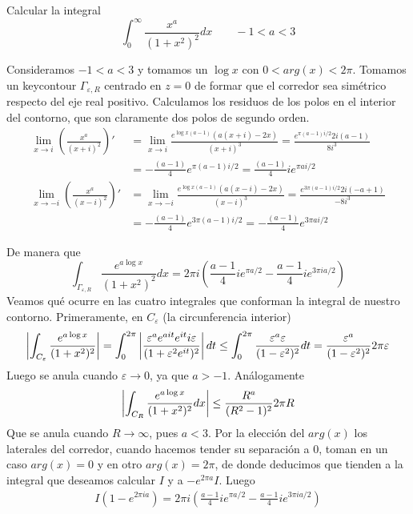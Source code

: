 \documentclass[twoside]{article}
\begin{document}
\begin{ejercicio}{3}
Calcular la integral
$$
\int_0^\infty \frac{x^a}{(1+x^2)^2}dx \qquad -1<a<3
$$
\end{ejercicio}
\begin{solucion}
Consideramos $-1<a<3$ y tomamos un $\log x$ con $0<arg(x)<2\pi$.  Tomamos un keycontour $\Gamma_{\varepsilon,R}$ centrado en $z=0$ de formar que el corredor sea simétrico respecto del eje  real positivo. Calculamos los residuos de los polos en el interior del contorno, que son claramente dos polos de segundo orden.
\begin{align*}
\lim_{x\to i} \left(\frac{x^a}{(x+i)^2}\right)' &= \lim_{x\to i}\frac{e^{\log{x}(a-1)}(a(x+i)-2x)}{(x+i)^3} = \frac{e^{\pi (a-1)i/2}2i(a-1)}{8i^3}\\ 
&=-\frac{(a-1)}{4}e^{\pi (a-1)i/2} =\frac{(a-1)}{4}ie^{\pi ai/2} \\
\lim_{x\to -i} \left(\frac{x^a}{(x-i)^2}\right)' &= \lim_{x\to -i}\frac{e^{\log{x}(a-1)}(a(x-i)-2x)}{(x-i)^3} =\frac{e^{3\pi (a-1)i/2}2i(-a+1)}{-8i^3}\\ 
&=-\frac{(a-1)}{4}e^{3\pi (a-1)i/2} = -\frac{(a-1)}{4}e^{3\pi ai/2}
\end{align*}

De manera que
$$
\int_{\Gamma_{\varepsilon,R}} \frac{e^{a \log x}}{(1+x^2)^2}dx = 2\pi i\left( \frac{a-1}{4}ie^{\pi a/2}-\frac{a-1}{4}ie^{3\pi i a /2}\right)
$$
Veamos qué ocurre en las cuatro integrales que conforman la integral de nuestro contorno. Primeramente, en $C_\varepsilon$ (la circunferencia interior)
$$
\left\lvert\int_{C_\varepsilon}\frac{e^{a \log x}}{(1+x^2)^2} \right\rvert=\int_0^{2\pi} \left\lvert\frac{\varepsilon^a e^{ait} e^{it} i \varepsilon}{(1+\varepsilon^2e^{it})^2}\right\rvert dt\leq \int_0^{2\pi}\frac{\varepsilon^a\varepsilon}{(1-\varepsilon^2)^2}dt = \frac{\varepsilon^a}{(1-\varepsilon^2)^2}2\pi \varepsilon 
$$ 
Luego se anula cuando $\varepsilon \to 0$, ya que $a>-1$. Análogamente
$$
\left\lvert\int_{C_R} \frac{e^{a \log x}}{(1+x^2)^2} dx \right\rvert \leq  \frac{R^a}{(R^2-1)^2}2\pi R
$$
Que se anula cuando $R\to\infty$, pues $a<3$. Por la elección del $arg(x)$ los laterales del corredor, cuando hacemos tender su separación a $0$, toman en un caso $arg(x)=0$ y en otro $arg(x)=2\pi$, de donde deducimos que tienden a la integral que deseamos calcular $I$ y a $-e^{2\pi a}I$. Luego
\begin{align*}
I(1-e^{2\pi i a}) = 2\pi i\left( \frac{a-1}{4}ie^{\pi a/2}-\frac{a-1}{4}ie^{3\pi i a /2}\right)
\end{align*}
\end{solucion}
\newpage
\end{document}
